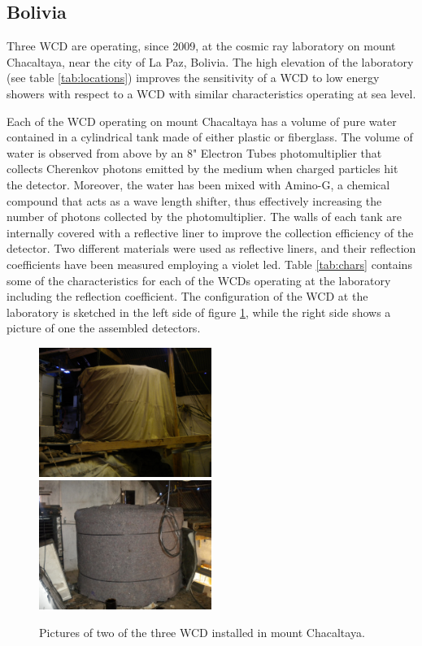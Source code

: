 \subsection{Bolivia}\label{subsec:bol}

Three WCD are operating, since 2009, at the cosmic ray laboratory on mount
Chacaltaya, near the city of La Paz, Bolivia. The high elevation of the
laboratory (see table \ref{tab:locations}) improves the sensitivity of a WCD to
low energy showers with respect to a WCD with similar characteristics operating
at sea level.

Each of the WCD operating on mount Chacaltaya has a volume of pure water
contained in a cylindrical tank made of either plastic or fiberglass. The
volume of water is observed from above by an 8"  Electron Tubes
photomultiplier that collects Cherenkov photons emitted by the medium when
charged particles hit the detector. Moreover, the water has been
mixed with Amino-G, a chemical compound that acts as a wave length shifter,
thus effectively increasing the number of photons collected by the
photomultiplier. The walls of each tank are internally covered with a
reflective liner to improve the collection efficiency of the detector. Two
different materials were used as reflective liners, and their reflection
coefficients have been measured employing a violet led. Table \ref{tab:chars}
contains some of the characteristics for each of the WCDs operating at the
laboratory including the reflection coefficient. The configuration of the WCD
at the laboratory is sketched in the left side of figure \ref{fig:bolivia-wcd},
while the right side shows a picture of one the assembled detectors.

\begin{figure}[h!]
\includegraphics[width=0.5\textwidth]{images/bolivia/cha1139-m.jpg}
\includegraphics[width=0.5\textwidth]{images/bolivia/cha1140-m.jpg}
\caption{Pictures of two of the three WCD installed in mount Chacaltaya.}
\label{fig:bolivia-wcd}
\end{figure}

